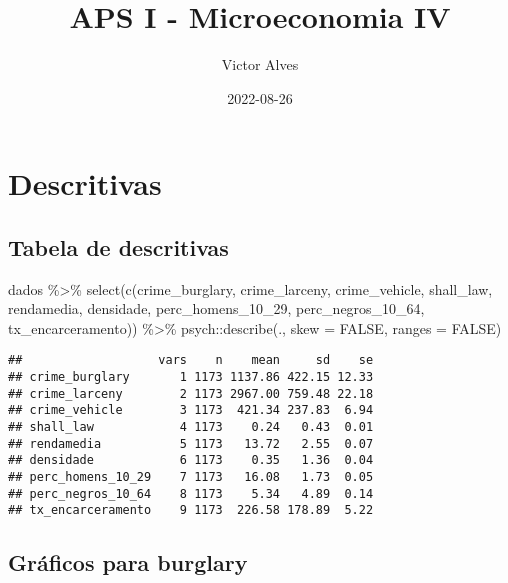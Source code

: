 \documentclass[
]{article}
\title{APS I - Microeconomia IV}
\author{Victor Alves}
\date{2022-08-26}
\newenvironment{Shaded}{\begin{snugshade}}{\end{snugshade}}
\newcommand{\AttributeTok}[1]{\textcolor[rgb]{0.77,0.63,0.00}{#1}}
\newcommand{\ConstantTok}[1]{\textcolor[rgb]{0.00,0.00,0.00}{#1}}
\newcommand{\FunctionTok}[1]{\textcolor[rgb]{0.00,0.00,0.00}{#1}}
\newcommand{\NormalTok}[1]{#1}
\newcommand{\SpecialCharTok}[1]{\textcolor[rgb]{0.00,0.00,0.00}{#1}}
\begin{document}
\maketitle

{
\setcounter{tocdepth}{2}
\tableofcontents
}
\hypertarget{descritivas}{%
\section{Descritivas}\label{descritivas}}

\hypertarget{tabela-de-descritivas}{%
\subsection{Tabela de descritivas}\label{tabela-de-descritivas}}

\begin{Shaded}
\begin{Highlighting}[]
\NormalTok{dados }\SpecialCharTok{\%\textgreater{}\%} 
  \FunctionTok{select}\NormalTok{(}\FunctionTok{c}\NormalTok{(crime\_burglary, crime\_larceny, crime\_vehicle, shall\_law, rendamedia,}
\NormalTok{           densidade, perc\_homens\_10\_29, perc\_negros\_10\_64, tx\_encarceramento)) }\SpecialCharTok{\%\textgreater{}\%} 
\NormalTok{  psych}\SpecialCharTok{::}\FunctionTok{describe}\NormalTok{(., }\AttributeTok{skew =} \ConstantTok{FALSE}\NormalTok{, }\AttributeTok{ranges =} \ConstantTok{FALSE}\NormalTok{)}
\end{Highlighting}
\end{Shaded}

\begin{verbatim}
##                   vars    n    mean     sd    se
## crime_burglary       1 1173 1137.86 422.15 12.33
## crime_larceny        2 1173 2967.00 759.48 22.18
## crime_vehicle        3 1173  421.34 237.83  6.94
## shall_law            4 1173    0.24   0.43  0.01
## rendamedia           5 1173   13.72   2.55  0.07
## densidade            6 1173    0.35   1.36  0.04
## perc_homens_10_29    7 1173   16.08   1.73  0.05
## perc_negros_10_64    8 1173    5.34   4.89  0.14
## tx_encarceramento    9 1173  226.58 178.89  5.22
\end{verbatim}

\hypertarget{gruxe1ficos-para-burglary}{%
\subsection{Gráficos para burglary}\label{gruxe1ficos-para-burglary}}
\end{document}
